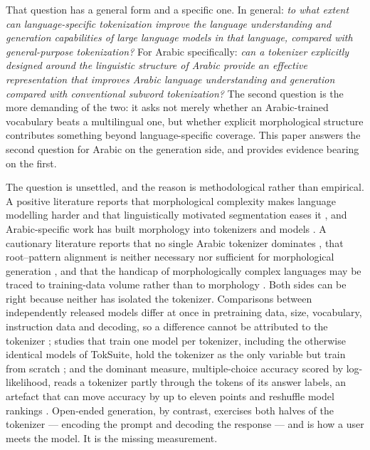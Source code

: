 \documentclass[a4paper,fleqn]{cas-sc}
\begin{document}
That question has a general form and a specific one. In general: \emph{to what extent can language-specific tokenization improve the language understanding and generation capabilities of large language models in that language, compared with general-purpose tokenization?} For Arabic specifically: \emph{can a tokenizer explicitly designed around the linguistic structure of Arabic provide an effective representation that improves Arabic language understanding and generation compared with conventional subword tokenization?} The second question is the more demanding of the two: it asks not merely whether an Arabic-trained vocabulary beats a multilingual one, but whether explicit morphological structure contributes something beyond language-specific coverage. This paper answers the second question for Arabic on the generation side, and provides evidence bearing on the first.

The question is unsettled, and the reason is methodological rather than empirical. A positive literature reports that morphological complexity makes language modelling harder and that linguistically motivated segmentation eases it \citep{park2021morphology,hofmann2021superbizarre,bostrom2020byte}, and Arabic-specific work has built morphology into tokenizers and models \citep{antoun2020arabert,alrefaie2024exploring,asgari2025morphbpe,asgari2026morphbpe}. A cautionary literature reports that no single Arabic tokenizer dominates \citep{alyafeai2023evaluating}, that root--pattern alignment is neither necessary nor sufficient for morphological generation \citep{alakeel2026morphemes}, and that the handicap of morphologically complex languages may be traced to training-data volume rather than to morphology \citep{arnett2025why}. Both sides can be right because neither has isolated the tokenizer. Comparisons between independently released models differ at once in pretraining data, size, vocabulary, instruction data and decoding, so a difference cannot be attributed to the tokenizer \citep{alakeel2026morphemes,reda2026yallamorph}; studies that train one model per tokenizer, including the otherwise identical models of TokSuite, hold the tokenizer as the only variable but train from scratch \citep{altintas2025toksuite}; and the dominant measure, multiple-choice accuracy scored by log-likelihood, reads a tokenizer partly through the tokens of its answer labels, an artefact that can move accuracy by up to eleven points and reshuffle model rankings \citep{zheng2024large,sanzguerrero2025mind}. Open-ended generation, by contrast, exercises both halves of the tokenizer --- encoding the prompt and decoding the response --- and is how a user meets the model. It is the missing measurement.
\end{document}
